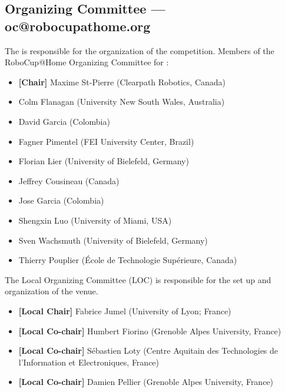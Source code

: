\subsection{Organizing Committee --- oc@robocupathome.org}
\label{sec:oc}
The  is responsible for the organization of the competition. Members of the RoboCup@Home Organizing Committee for \YEAR:

\begin{itemize}
	\item \textbf{[Chair]} Maxime St-Pierre (Clearpath Robotics, Canada)
	\item Colm Flanagan (University New South Wales, Australia)
	\item David Garcia (Colombia)
	\item Fagner Pimentel (FEI University Center, Brazil)
	\item Florian Lier (University of Bielefeld, Germany)
	\item Jeffrey Cousineau (Canada)
	\item Jose Garcia (Colombia)
	\item Shengxin Luo (University of Miami, USA)
	\item Sven Wachsmuth (University of Bielefeld, Germany)
	\item Thierry Pouplier (École de Technologie Supérieure, Canada)
\end{itemize}

The Local Organizing Committee (LOC) is responsible for the set up and organization of the venue.
\begin{itemize}
	\item \textbf{[Local Chair]} Fabrice Jumel (University of Lyon; France)
    \item \textbf{[Local Co-chair]} Humbert Fiorino (Grenoble Alpes University, France)
    \item \textbf{[Local Co-chair]} Sébastien Loty (Centre Aquitain des Technologies de l’Information et Electroniques, France)
    \item \textbf{[Local Co-chair]} Damien Pellier (Grenoble Alpes University, France)
\end{itemize}
